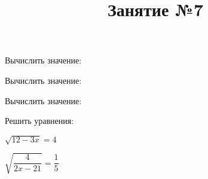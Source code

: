 \begin{listofex}
	\item Вычислить значение:
	\begin{enumcols}[itemcolumns=3]
		\item {}
		\item {}
		\item {}
		\item {}
		\item {}
	\end{enumcols}
	\item Вычислить значение:
	\begin{enumcols}[itemcolumns=2]
		\item {}
		\item {}
		\item {}
		\item {}
		\item {}
	\end{enumcols}
	\item Вычислить значение:
	\begin{enumcols}[itemcolumns=2]
		\item {}
		\item {}
		\item {}
	\end{enumcols}
	\item {}
	\item Решить уравнения:
	\begin{enumcols}[itemcolumns=2]
		\item {}
		\item \( \sqrt{12-3x}=4 \)
		\item \( \sqrt{\dfrac{4}{2x-21}}=\dfrac{1}{5} \)
		\item {}
	\end{enumcols}
\end{listofex}
\newpage
\title{Занятие №7}
